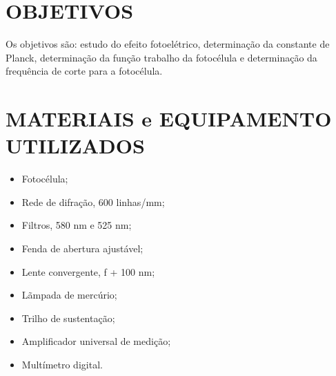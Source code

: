 \documentclass[10pt,twocolumn,letterpaper]{article}
\begin{document}

\section{OBJETIVOS}

\hspace{1cm} Os objetivos são: estudo do efeito fotoelétrico, determinação da constante de Planck, determinação da função trabalho da fotocélula e determinação da frequência de corte para a fotocélula. 


\section{MATERIAIS e EQUIPAMENTO UTILIZADOS}

\begin{itemize}
    \item Fotocélula;
    \item Rede de difração, 600 linhas/mm;
    \item Filtros, 580 nm e 525 nm;
    \item Fenda de abertura ajustável;
    \item Lente convergente, f + 100 nm;
    \item Lãmpada de mercúrio;
    \item Trilho de sustentação;
    \item Amplificador universal de medição;
    \item Multímetro digital.
\end{itemize}
\end{document}
